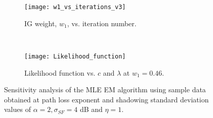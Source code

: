 \documentclass[12pt, draftclsnofoot, onecolumn]{IEEEtran}
\theoremstyle{plain}
\begin{document}
\begin{figure*}[t!]
    \centering
    \begin{subfigure}[t]{0.5\textwidth}
        \centering
        \texttt{[image: w1\_vs\_iterations\_v3]}
        \vspace{-0.16in}
        \caption{{\small IG weight, $w_1$, vs. iteration number.}}
        \label{Sens1}
    \end{subfigure}%
    ~ 
    \begin{subfigure}[t]{0.45\textwidth}
        \centering
        \texttt{[image: Likelihood\_function]}
        \vspace{-0.16in}
        \caption{{\small Likelihood function vs. $c$ and $\lambda$ at $w_1=0.46$.}}
        \label{Sens2}
    \end{subfigure}\vspace{-0.4in}
    \caption{Sensitivity analysis of the MLE EM algorithm using sample data obtained at path loss exponent and shadowing standard deviation values of $\alpha = 2, \sigma_{SF} =4$ dB and $\eta=1$.} 
        \label{Sens12}
	\vspace{-0.45in}
\end{figure*}
\fi
%
\iffalse
\begin{figure}[t]%
        \centering
        \texttt{[image: w1\_vs\_iterations\_v3]}
        \DeclareGraphicsExtensions{.eps}
        \vspace{-0.16in}
        \caption{Sensitivity analysis of the MLE EM algorithm using sample data obtained at path loss exponent and shadowing standard deviation values of $\alpha = 2, \sigma_{SF} =4$ dB and $\eta=1$.} 
        \label{Sens12}
        \vspace{-.45in}
\end{figure}%
\fi
\end{document}
